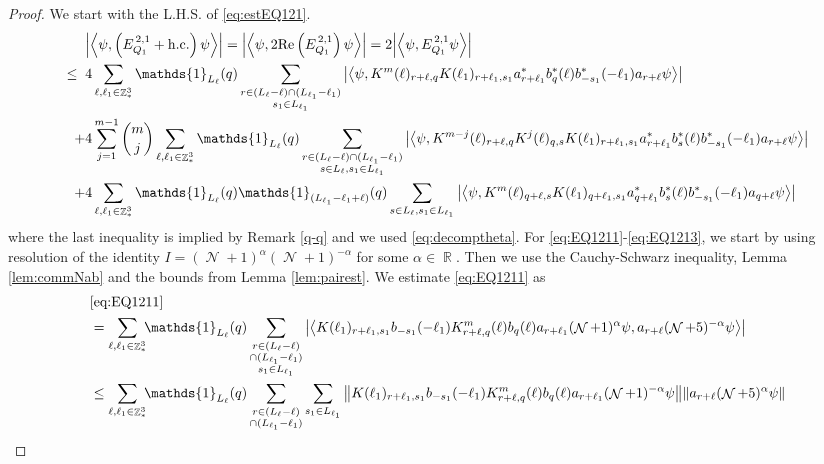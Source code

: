 \documentclass[sn-mathphys, Numbered ,a4paper]{sn-jnl}%
\DeclareMathOperator{\R}{\mathbb{R}}
\DeclareMathOperator{\Z}{\mathbb{Z}}
\DeclareMathOperator{\NN}{\mathcal{N}}
\newcommand{\eva}[1]{\left\langle #1 \right\rangle}
\theoremstyle{plain}
\theoremstyle{definition}
\theoremstyle{remark}
\theoremstyle{plain}
\theoremstyle{definition}
\theoremstyle{remark}
\begin{document}
\begin{proof}
We start with the L.H.S. of \eqref{eq:estEQ121}.
\begin{align}
	&\abs{\eva{\psi,\left(E^{\,2,1}_{Q_1}+\mathrm{h.c.}\right) \psi }} = \abs{\eva{\psi,2\mathrm{Re}\left(E^{\,2,1}_{Q_1}\right) \psi }} = 2\abs{\eva{\psi, E^{\,2,1}_{Q_1} \psi }}\nonumber\\
	\leq\;\;&4 \sum\limits_{\ell, \ell_1\in \Z^3_*} \mathds{1}_{L_{\ell}}(q) \sum\limits_{\substack{r\in (L_{\ell}-\ell) \cap (L_{\ell_1}-\ell_1)\\ s_1\in L_{\ell_1} }} \abs{\eva{\psi, K^m(\ell )_{r+\ell,q}K(\ell_1)_{r+\ell_1,s_1}
	a^*_{r+\ell_1} b^*_{q}(\ell) b^*_{-s_1}(-\ell_1)a_{r+\ell} \psi }} \label{eq:EQ1211}\\
	\;+&4 \sum\limits_{j=1}^{m-1} {{m}\choose j} \sum\limits_{\ell, \ell_1\in \Z^3_*}\mathds{1}_{L_{\ell}}(q) \sum\limits_{\substack{r\in (L_{\ell}-\ell) \cap (L_{\ell_1}-\ell_1)\\ s \in L_{\ell},s_1\in L_{\ell_1} }}  \abs{\eva{\psi,  K^{m-j}(\ell)_{r+\ell,q} K^{j}(\ell)_{q,s} K(\ell_1)_{r+\ell_1,s_1} a^*_{r+\ell_1} b^*_{s}(\ell) b^*_{-s_1}(-\ell_1) a_{r+\ell} \psi }} \label{eq:EQ1212}\\
	\;+&4\sum\limits_{\ell, \ell_1\in \Z^3_*} \mathds{1}_{L_{\ell}}(q) \mathds{1}_{(L_{\ell_1}-\ell_1+\ell)}(q) \sum\limits_{s \in L_{\ell},s_1\in L_{\ell_1}} \abs{\eva{\psi, K^m(\ell)_{q+\ell,s} K(\ell_1)_{q+\ell_1,s_1} a^*_{q+\ell_1} b^*_{s}(\ell) b^*_{-s_1}(-\ell_1) a_{q+\ell} \psi }}\label{eq:EQ1213}
\end{align}
where the last inequality is implied by Remark \ref{q-q} and we used \eqref{eq:decomptheta}.
For \eqref{eq:EQ1211}-\eqref{eq:EQ1213}, we start by using resolution of the identity $I = (\NN+1)^{\alpha}(\NN+1)^{-\alpha}$ for some $\alpha \in \R$. Then we use the Cauchy-Schwarz inequality, Lemma \ref{lem:commNab} and the bounds from Lemma \ref{lem:pairest}. We estimate \eqref{eq:EQ1211} as
\begin{alignat}{2}
	&\eqref{eq:EQ1211}\nonumber\\
	&= \sum\limits_{\ell,\ell_1 \in \Z^3_*}\!\! \mathds{1}_{L_\ell}(q) \sum\limits_{\substack{r\in (L_{\ell}-\ell)\\ \cap (L_{\ell_1}-\ell_1)\\ s_1 \in L_{\ell_1}}} \abs{\eva{ K(\ell_1)_{r+\ell_1,s_1} b_{-s_1}(-\ell_1) K^{m}_{r+\ell,q}(\ell) b_{q}(\ell) a_{r+\ell_1} (\NN+1)^{\alpha}  \psi,  a_{r+\ell} (\NN+5)^{-\alpha} \psi }}\nonumber\\
	&\leq \sum\limits_{\ell,\ell_1 \in \Z^3_*} \!\!\mathds{1}_{L_\ell}(q) \sum\limits_{\substack{r\in (L_{\ell}-\ell)\\ \cap (L_{\ell_1}-\ell_1)}}  \sum\limits_{s_1 \in L_{\ell_1}}  \norm{ K(\ell_1)_{r+\ell_1,s_1} b_{-s_1}(-\ell_1) K^{m}_{r+\ell,q}(\ell) b_{q}(\ell) a_{r+\ell_1} (\NN+1)^{-\alpha}\psi}\norm{  a_{r+\ell} (\NN+5)^{\alpha}\psi } \nonumber\\

\end{alignat}
\end{proof}
\end{document}
